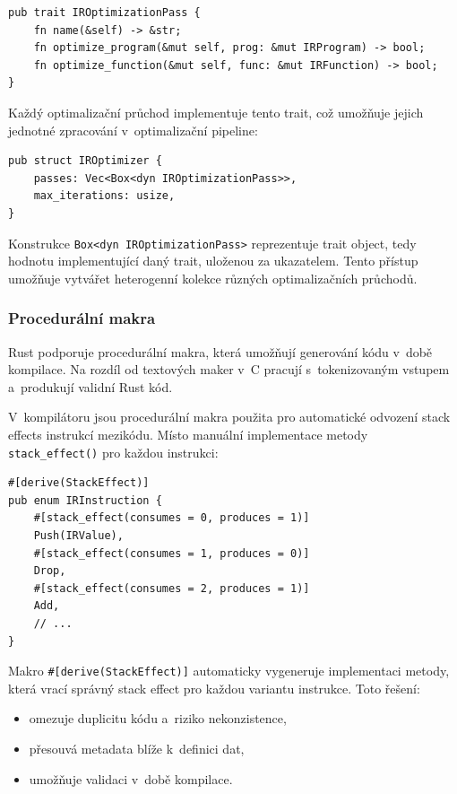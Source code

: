 \begin{lstlisting}[basicstyle=\small\ttfamily]
pub trait IROptimizationPass {
    fn name(&self) -> &str;
    fn optimize_program(&mut self, prog: &mut IRProgram) -> bool;
    fn optimize_function(&mut self, func: &mut IRFunction) -> bool;
}
\end{lstlisting}

Každý optimalizační průchod implementuje tento trait, což umožňuje
jejich jednotné zpracování v~optimalizační pipeline:

\begin{lstlisting}[basicstyle=\small\ttfamily]
pub struct IROptimizer {
    passes: Vec<Box<dyn IROptimizationPass>>,
    max_iterations: usize,
}
\end{lstlisting}

Konstrukce \texttt{Box<dyn IROptimizationPass>} reprezentuje trait object,
tedy hodnotu implementující daný trait, uloženou za ukazatelem. Tento přístup
umožňuje vytvářet heterogenní kolekce různých optimalizačních průchodů.


\subsubsection{Procedurální makra}
\label{sec:rust-macros}

Rust podporuje procedurální makra, která umožňují generování kódu
v~době kompilace. Na rozdíl od textových maker v~C pracují
s~tokenizovaným vstupem a~produkují validní Rust kód.

V~kompilátoru \Roth{} jsou procedurální makra použita pro
automatické odvození stack effects instrukcí mezikódu. Místo
manuální implementace metody \texttt{stack\_effect()} pro každou
instrukci:

\begin{lstlisting}[basicstyle=\small\ttfamily]
#[derive(StackEffect)]
pub enum IRInstruction {
    #[stack_effect(consumes = 0, produces = 1)]
    Push(IRValue),
    #[stack_effect(consumes = 1, produces = 0)]
    Drop,
    #[stack_effect(consumes = 2, produces = 1)]
    Add,
    // ...
}
\end{lstlisting}

Makro \texttt{\#[derive(StackEffect)]} automaticky vygeneruje
implementaci metody, která vrací správný stack effect pro každou
variantu instrukce. Toto řešení:
\begin{itemize}
	\item omezuje duplicitu kódu a~riziko nekonzistence,
	\item přesouvá metadata blíže k~definici dat,
	\item umožňuje validaci v~době kompilace.
\end{itemize}


